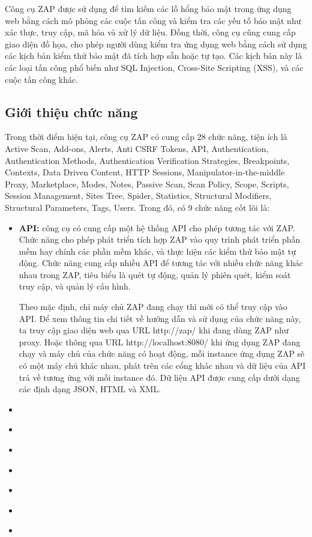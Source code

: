 Công cụ ZAP được sử dụng để tìm kiếm các lỗ hổng bảo mật trong ứng dụng web bằng cách mô phỏng các cuộc tấn công và kiểm tra các yếu tố bảo mật như xác thực, truy cập, mã hóa và xử lý dữ liệu.
Đồng thời, công cụ cũng cung cấp giao diện đồ họa, cho phép người dùng kiểm tra ứng dụng web bằng cách sử dụng các kịch bản kiểm thử bảo mật đã tích hợp sẵn hoặc tự tạo.
Các kịch bản này là các loại tấn công phổ biến như SQL Injection, Cross-Site Scripting (XSS), và các cuộc tấn công khác.

\subsection{Giới thiệu chức năng}

\tab Trong thời điểm hiện tại, công cụ ZAP có cung cấp 28 chức năng, tiện ích là Active Scan, Add-ons, Alerts, Anti CSRF Tokens, API, Authentication, Authentication Methods, Authentication Verification Strategies, Breakpoints, Contexts, Data Driven Content, HTTP Sessions, Manipulator-in-the-middle Proxy, Marketplace, Modes, Notes, Passive Scan, Scan Policy, Scope, Scripts, Session Management, Sites Tree, Spider, Statistics, Structural Modifiers, Structural Parameters, Tags, Users.
Trong đó, có 9 chức năng cốt lõi là:

\begin{itemize}
  \item \textbf{API:} công cụ có cung cấp một hệ thống API cho phép tương tác với ZAP.
  Chức năng cho phép phát triển tích hợp ZAP vào quy trình phát triển phần mềm hay chính các phần mềm khác, và thực hiện các kiểm thử bảo mật tự động.
  Chức năng cung cấp nhiều API để tương tác với nhiều chức năng khác nhau trong ZAP, tiêu biểu là quét tự động, quản lý phiên quét, kiểm soát truy cập, và quản lý cấu hình.
  \par
  Theo mặc định, chỉ máy chủ ZAP đang chạy thì mới có thể truy cập vào API.
  Để xem thông tin chi tiết về hướng dẫn và sử dụng của chức năng này, ta truy cập giao diện web qua URL http://zap/ khi đang dùng ZAP như proxy.
  Hoặc thông qua URL http://localhost:8080/ khi ứng dụng ZAP đang chạy và máy chủ của chức năng có hoạt động, mỗi instance ứng dụng ZAP sẽ có một máy chủ khác nhau, phát trên các cổng khác nhau và dữ liệu của API trả về tương ứng với mỗi instance đó.
  Dữ liệu API được cung cấp dưới dạng các định dạng JSON, HTML và XML.
  \item \textbf{}
  \item \textbf{}
  \item \textbf{}
  \item \textbf{}
  \item \textbf{}
  \item \textbf{}
  \item \textbf{}
\end{itemize}




